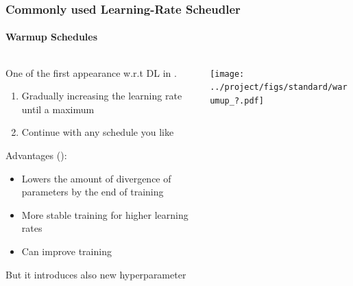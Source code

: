 \documentclass[10pt,aspectratio=169]{beamer}
\begin{document}
    \begin{frame}
        \frametitle{Commonly used Learning-Rate Scheudler}
        \framesubtitle{Warmup Schedules}

        \begin{columns}
            \begin{column}{0.5\textwidth}
                One of the first appearance w.r.t DL in \cite{he2016deep}.

                \begin{enumerate}
                    \item Gradually increasing the learning rate until a maximum 
                    \item Continue with any schedule you like
                \end{enumerate}
                \vspace{0.5cm}
                
                Advantages (\cite{gotmare2018closer}):
                \begin{itemize}
                    \item Lowers the amount of divergence of parameters by the end of training
                    \item More stable training for higher learning rates
                    \item Can improve training
                \end{itemize}

                \vspace{0.5cm}
                But it introduces also new hyperparameter
            \end{column}
            \begin{column}{0.5\textwidth}
                \texttt{[image: ../project/figs/standard/warumup\_?.pdf]}
            \end{column}
        \end{columns}    
    \end{frame}
\end{document}
